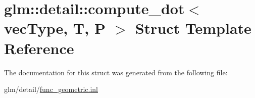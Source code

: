 \hypertarget{structglm_1_1detail_1_1compute__dot}{\section{glm\-:\-:detail\-:\-:compute\-\_\-dot$<$ vec\-Type, T, P $>$ Struct Template Reference}
\label{structglm_1_1detail_1_1compute__dot}
}


The documentation for this struct was generated from the following file\-:\begin{DoxyCompactItemize}
\item 
glm/detail/\hyperlink{func__geometric_8inl}{func\-\_\-geometric.\-inl}\end{DoxyCompactItemize}
